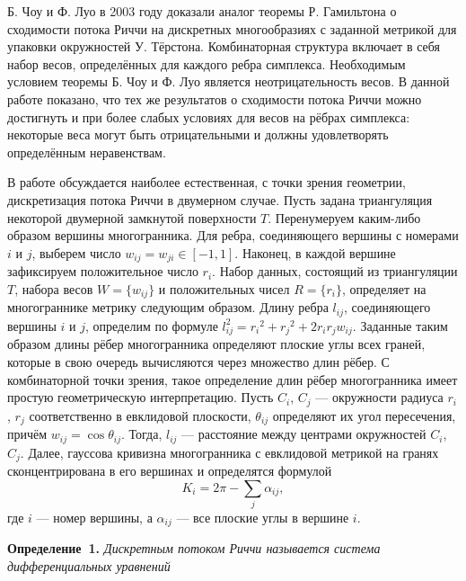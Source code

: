 




Б. Чоу и Ф. Луо в 2003 году доказали аналог теоремы Р. Гамильтона о сходимости потока Риччи на дискретных многообразиях с заданной метрикой для  упаковки окружностей У. Тёрстона. Комбинаторная структура включает в себя набор весов, определённых для каждого ребра симплекса. Необходимым условием теоремы Б. Чоу и Ф. Луо является неотрицательность весов. В данной работе показано, что тех же результатов о сходимости потока Риччи можно достигнуть и при более слабых условиях для весов на рёбрах симплекса: некоторые веса могут быть отрицательными и должны удовлетворять определённым неравенствам.

В работе обсуждается наиболее
естественная, с точки
зрения геометрии, дискретизация потока
Риччи в двумерном случае.
Пусть задана триангуляция некоторой
двумерной замкнутой поверхности $T$.
Перенумеруем каким-либо образом вершины
многогранника. Для ребра,
соединяющего вершины с номерами $i$ и $j$,
выберем число $ w_{ij} =
w_{ji} \in [-1,1]$. Наконец, в каждой вершине
зафиксируем
положительное число $r_i$. Набор данных,
состоящий из триангуляции
$T$, набора весов $W = \{ w_{ij} \}$ и положительных чисел
$R = \{ r_i \}$, определяет на многограннике
метрику следующим
образом. Длину ребра $l_{ij}$, соединяющего
вершины $i$ и $j$,
определим по формуле $l_{ij}^2 = {r_i}^2 + {r_j}^2 +
2r_i
r_jw_{ij}$. Заданные таким образом длины
рёбер многогранника
определяют плоские углы всех граней, которые в свою очередь вычисляются через множество длин рёбер.
С комбинаторной точки зрения, такое определение длин рёбер многогранника имеет простую геометрическую интерпретацию. Пусть  $C_i$, $C_j$ --- окружности радиуса $r_i$, $r_j$ соответственно  в евклидовой плоскости, $ \theta_{ij} $ определяют их угол пересечения, причём $ w_{ij} = \cos \theta_{ij} $. Тогда, $l_{ij}$ --- расстояние между центрами окружностей $C_i$, $C_j$.
Далее, гауссова кривизна многогранника с
евклидовой метрикой на
гранях сконцентрирована в его вершинах и
определятся формулой
$$
K_i = 2 \pi - \sum_{j} \alpha_{ij},
$$
где $i$ --- номер вершины, а $\alpha_{ij}$ --- все
плоские углы в
вершине $i$.

\textbf{Определение~1.} {\it
Дискретным потоком Риччи называется
система дифференциальных уравнений}


